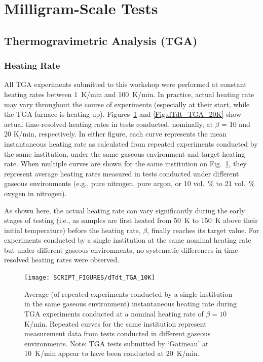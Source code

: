 \documentclass{book}
\begin{document}
\section{Milligram-Scale Tests}

\subsection{Thermogravimetric Analysis (TGA)}
\label{TGA_analysis}

\subsubsection{Heating Rate}

All TGA experiments submitted to this workshop were performed at constant heating rates between 1~K/min and 100~K/min. In practice, actual heating rate may vary throughout the course of experiments (especially at their start, while the TGA furnace is heating up). Figures~\ref{Fig:dTdt_TGA_10K} and \ref{Fig:dTdt_TGA_20K} show actual time-resolved heating rates in tests conducted, nominally, at $\beta$ = 10 and 20 K/min, respectively. In either figure, each curve represents the mean instantaneous heating rate as calculated from repeated experiments conducted by the same institution, under the same gaseous environment and target heating rate. When multiple curves are shown for the same institution on Fig.~\ref{Fig:dTdt_TGA_10K}, they represent average heating rates measured in tests conducted under different gaseous environments (e.g., pure nitrogen, pure argon, or 10 vol.~\% to 21 vol.~\% oxygen in nitrogen).

As shown here, the actual heating rate can vary significantly during the early stages of testing (i.e., as samples are first heated from 50~K to 150~K above their initial temperature) before the heating rate, $\beta$, finally reaches its target value. For experiments conducted by a single institution at the same nominal heating rate but under different gaseous environments, no systematic differences in time-resolved heating rates were observed.

\begin{figure}
  \centering
  \texttt{[image: SCRIPT\_FIGURES/dTdt\_TGA\_10K]}
  \caption{Average (of repeated experiments conducted by a single institution in the same gaseous environment) instantaneous heating rate during TGA experiments conducted at a nominal heating rate of $\beta=10$ K/min. Repeated curves for the same institution represent measurement data from tests conducted in different gaseous environments. Note: TGA tests submitted by ‘Gatineau’ at 10~K/min appear to have been conducted at 20~K/min.}
  \label{Fig:dTdt_TGA_10K}
\end{figure}
\end{document}
